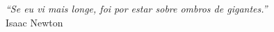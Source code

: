 
\chapter*{}
\vspace{15cm}
\begin{flushright}
	\textit
	{
		``Se eu vi mais longe, foi por estar sobre ombros de gigantes.''
	}\medskip\\ 
	Isaac Newton
\end{flushright}